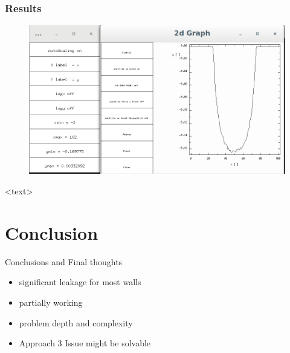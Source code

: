\documentclass{beamer}
\begin{document}
\begin{frame}
\frametitle{Results}
\begin{figure}
\includegraphics[scale=0.2]{A2p3}
\caption{}
\end{figure}
<text>
\end{frame}
\section{Conclusion}
\begin{frame}{Conclusions and Final thoughts}

\begin{itemize}
  \item significant leakage for most walls
  \item partially working
  \item problem depth and complexity
  \item Approach 3 Issue might be solvable   
\end{itemize}

\vskip 1cm

\end{frame}
\end{document}
